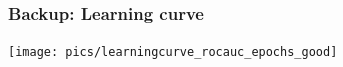 \documentclass{beamer}
\begin{document}

\begin{frame}
    \frametitle{Backup: Learning curve}
    \centering\texttt{[image: pics/learningcurve\_rocauc\_epochs\_good]}%
\end{frame}

\end{document}
